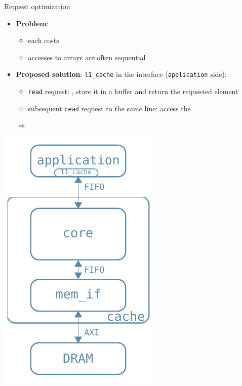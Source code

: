 \documentclass[handout,aspectratio=169]{beamer}
\begin{document}
\begin{frame}{Request optimization}
	\begin{minipage}{.7\textwidth}
		\begin{itemize}[<+->]
			\item \textbf{Problem}:
				\begin{itemize}[<.->]
					\item each  costs
					\item accesses to arrays are often sequential
				\end{itemize}
			\item \textbf{Proposed solution}:
				\texttt{l1\_cache} in the interface (\texttt{application}
				side):
				\begin{itemize}[<.->]
					\item \texttt{read} request:
						,
						store it in a buffer and return
						the requested element
					\item subsequent \texttt{read} request to the same
						line: access the 
				\end{itemize}
				$\Rightarrow$ 
		\end{itemize}
	\end{minipage}
	\begin{minipage}{.28\textwidth}
		\begin{center}
			\includegraphics[width=.8\textwidth]{l1_arch.pdf}
		\end{center}
	\end{minipage}
\end{frame}
\end{document}
